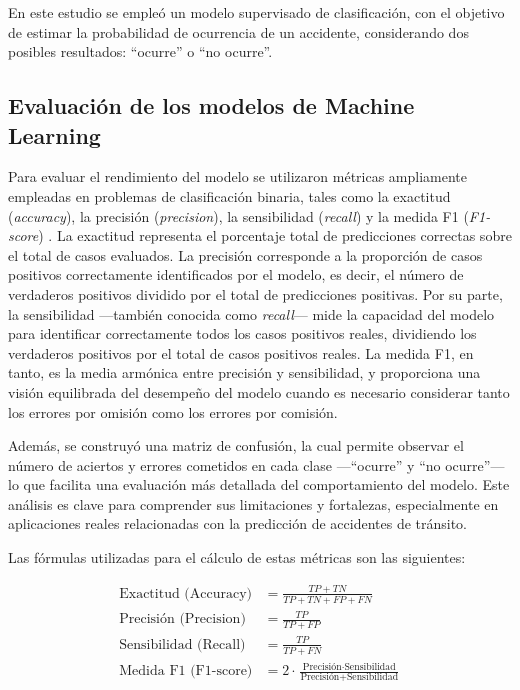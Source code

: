 \documentclass[12pt]{article}
\begin{document}
En este estudio se empleó un modelo supervisado de clasificación, con el objetivo de estimar la probabilidad de ocurrencia de un accidente, considerando dos posibles resultados: “ocurre” o “no ocurre”.

\subsection{Evaluación de los modelos de Machine Learning}

Para evaluar el rendimiento del modelo se utilizaron métricas ampliamente empleadas en problemas de clasificación binaria, tales como la exactitud (\textit{accuracy}), la precisión (\textit{precision}), la sensibilidad (\textit{recall}) y la medida F1 (\textit{F1-score}) \citep{manning2008}. La exactitud representa el porcentaje total de predicciones correctas sobre el total de casos evaluados. La precisión corresponde a la proporción de casos positivos correctamente identificados por el modelo, es decir, el número de verdaderos positivos dividido por el total de predicciones positivas. Por su parte, la sensibilidad —también conocida como \textit{recall}— mide la capacidad del modelo para identificar correctamente todos los casos positivos reales, dividiendo los verdaderos positivos por el total de casos positivos reales. La medida F1, en tanto, es la media armónica entre precisión y sensibilidad, y proporciona una visión equilibrada del desempeño del modelo cuando es necesario considerar tanto los errores por omisión como los errores por comisión.

Además, se construyó una matriz de confusión, la cual permite observar el número de aciertos y errores cometidos en cada clase —“ocurre” y “no ocurre”— lo que facilita una evaluación más detallada del comportamiento del modelo. Este análisis es clave para comprender sus limitaciones y fortalezas, especialmente en aplicaciones reales relacionadas con la predicción de accidentes de tránsito.

Las fórmulas utilizadas para el cálculo de estas métricas son las siguientes:

\[
\begin{aligned}
\text{Exactitud (Accuracy)} &= \frac{TP + TN}{TP + TN + FP + FN} \\
\text{Precisión (Precision)} &= \frac{TP}{TP + FP} \\
\text{Sensibilidad (Recall)} &= \frac{TP}{TP + FN} \\
\text{Medida F1 (F1-score)} &= 2 \cdot \frac{\text{Precisión} \cdot \text{Sensibilidad}}{\text{Precisión} + \text{Sensibilidad}}
\end{aligned}
\]
\end{document}
